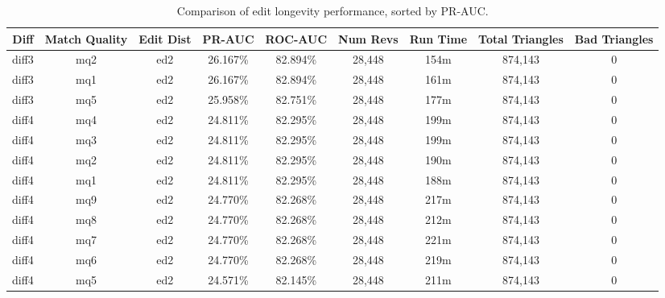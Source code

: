 \begin{sidewaystable}[!ph]
  \begin{center}
    \begin{tabular}{|c|c|c||c|c||c|c|c|c|}
\hline
Diff & Match Quality & Edit Dist
        & PR-AUC & ROC-AUC
        & Num Revs & Run Time
        & Total Triangles & Bad Triangles \\
\hline
\hline
diff3 & mq2 & ed2 & 26.167\% & 82.894\% & 28,448 & 154m & 874,143 & 0 \\
diff3 & mq1 & ed2 & 26.167\% & 82.894\% & 28,448 & 161m & 874,143 & 0 \\
diff3 & mq5 & ed2 & 25.958\% & 82.751\% & 28,448 & 177m & 874,143 & 0 \\
diff4 & mq4 & ed2 & 24.811\% & 82.295\% & 28,448 & 199m & 874,143 & 0 \\
diff4 & mq3 & ed2 & 24.811\% & 82.295\% & 28,448 & 199m & 874,143 & 0 \\
diff4 & mq2 & ed2 & 24.811\% & 82.295\% & 28,448 & 190m & 874,143 & 0 \\
diff4 & mq1 & ed2 & 24.811\% & 82.295\% & 28,448 & 188m & 874,143 & 0 \\
diff4 & mq9 & ed2 & 24.770\% & 82.268\% & 28,448 & 217m & 874,143 & 0 \\
diff4 & mq8 & ed2 & 24.770\% & 82.268\% & 28,448 & 212m & 874,143 & 0 \\
diff4 & mq7 & ed2 & 24.770\% & 82.268\% & 28,448 & 221m & 874,143 & 0 \\
diff4 & mq6 & ed2 & 24.770\% & 82.268\% & 28,448 & 219m & 874,143 & 0 \\
diff4 & mq5 & ed2 & 24.571\% & 82.145\% & 28,448 & 211m & 874,143 & 0 \\
\hline
\end{tabular}
\end{center}
\caption{Comparison of edit longevity performance,
    sorted by PR-AUC.}
\label{tab:editshoutL}
\end{sidewaystable}
\clearpage
